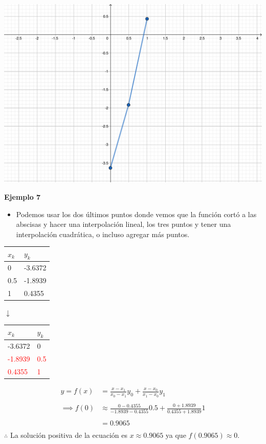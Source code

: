 \documentclass[]{book}
\providecommand{\tightlist}{%
  \setlength{\itemsep}{0pt}\setlength{\parskip}{0pt}}
\begin{document}
\begin{center}\includegraphics[width=0.75\linewidth]{Plots/U4/lagr_ecuacion1} \end{center}

\textbf{Ejemplo 7}

\begin{itemize}
\tightlist
\item
  Podemos usar los dos últimos puntos donde vemos que la función cortó a las abscisas y hacer una interpolación lineal, los tres puntos y tener una interpolación cuadrática, o incluso agregar más puntos.
\end{itemize}

\begin{longtable}[]{@{}ll@{}}
\toprule
\(x_k\) & \(y_k\)\tabularnewline
\midrule
\endhead
0 & -3.6372\tabularnewline
0.5 & -1.8939\tabularnewline
1 & 0.4355\tabularnewline
\bottomrule
\end{longtable}

\(\downarrow\)

\begin{longtable}[]{@{}ll@{}}
\toprule
\(x_k\) & \(y_k\)\tabularnewline
\midrule
\endhead
-3.6372 & 0\tabularnewline
\textcolor{red}{-1.8939} & \textcolor{red}{0.5}\tabularnewline
\textcolor{red}{0.4355} & \textcolor{red}{1}\tabularnewline
\bottomrule
\end{longtable}

\[
\begin{split}
y = f(x) &= \frac{x - x_1}{x_0 - x_1} y_0 + \frac{x - x_0}{x_1 - x_0} y_1 \\ \\
\implies f(0) &\approx \frac{0-0.4355}{-1.8939-0.4355} 0.5 + \frac{0+1.8939}{0.4355+1.8939} 1 \\ \\
&= 0.9065 \\
\end{split}
\]
\(\therefore\) La solución positiva de la ecuación es \(x \approx 0.9065\) ya que \(f(0.9065) \approx 0\).
\end{document}
